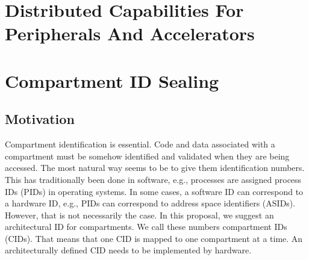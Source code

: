 \section{Distributed Capabilities For Peripherals And Accelerators} %




% 
% 
% 
% 
% 
% 
% 
% 
% 
% 



\section{Compartment ID Sealing} %

\subsection{Motivation}

Compartment identification is essential. Code and data associated with a compartment must be somehow identified and validated when they are being accessed.
The most natural way seems to be to give them identification numbers.
This has traditionally been done in software, e.g., processes are assigned process IDs (PIDs) in operating systems. In some cases, a software ID can correspond to a hardware ID, e.g., PIDs can correspond to address space identifiers (ASIDs).
However, that is not necessarily the case.
In this proposal, we suggest an architectural ID for compartments.
We call these numbers compartment IDs (CIDs). That means that one CID is mapped to one compartment at a time.
An architecturally defined CID needs to be implemented by hardware.

